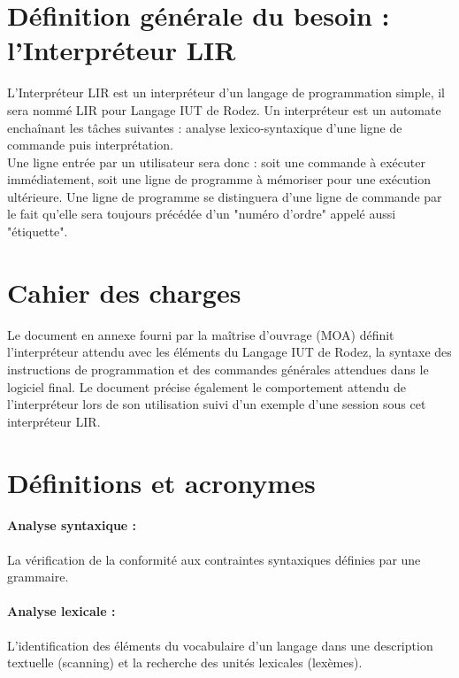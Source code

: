     \section{Définition générale du besoin : l'Interpréteur LIR}
L’Interpréteur LIR est un interpréteur d’un langage de programmation
simple, il sera nommé LIR pour Langage IUT de Rodez.
Un interpréteur est un automate enchaînant les tâches suivantes :
analyse lexico-syntaxique d’une ligne de commande puis interprétation.
\\Une ligne entrée par un utilisateur sera donc : soit une commande à
exécuter immédiatement, soit une ligne de programme à mémoriser pour
une exécution ultérieure. Une ligne de programme se distinguera d'une
ligne de commande par le fait qu'elle sera toujours précédée d'un
"numéro d'ordre" appelé aussi "étiquette".

\section{Cahier des charges}
Le document en annexe fourni par la maîtrise d’ouvrage (MOA) définit
l’interpréteur attendu avec les éléments du Langage IUT de Rodez, la
syntaxe des instructions de programmation et des commandes générales
attendues dans le logiciel final. Le document précise également le
comportement attendu de l’interpréteur lors de son utilisation suivi
d’un exemple d’une session sous cet interpréteur LIR.

\section{Définitions et acronymes}
\paragraph{Analyse syntaxique :}
La vérification de la conformité aux contraintes syntaxiques
définies par une grammaire.

\paragraph{Analyse lexicale :}
L’identification des éléments du vocabulaire d’un langage dans
une description textuelle (scanning) et la recherche des unités
lexicales (lexèmes).

